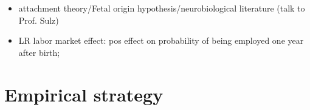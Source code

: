 \documentclass[11pt, a4paper,draft]{article} %
\begin{document}










\begin{itemize}
	\item attachment theory/Fetal origin hypothesis/neurobiological literature (talk to Prof. Sulz)

	\item LR labor market effect: pos effect on probability of being employed one year after birth; \cite{albagli2018}
\end{itemize} 



\newpage
\section{Empirical strategy}\label{sec:empirical_strategy}
\end{document}
